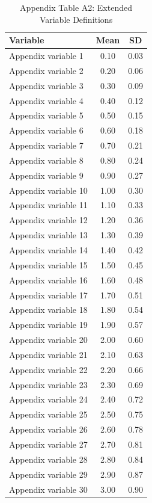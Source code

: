 \begin{longtable}{lcc}
\caption{Appendix Table A2: Extended Variable Definitions}\\
\toprule
Variable & Mean & SD \\
\midrule
Appendix variable 1 & 0.10 & 0.03 \\
Appendix variable 2 & 0.20 & 0.06 \\
Appendix variable 3 & 0.30 & 0.09 \\
Appendix variable 4 & 0.40 & 0.12 \\
Appendix variable 5 & 0.50 & 0.15 \\
Appendix variable 6 & 0.60 & 0.18 \\
Appendix variable 7 & 0.70 & 0.21 \\
Appendix variable 8 & 0.80 & 0.24 \\
Appendix variable 9 & 0.90 & 0.27 \\
Appendix variable 10 & 1.00 & 0.30 \\
Appendix variable 11 & 1.10 & 0.33 \\
Appendix variable 12 & 1.20 & 0.36 \\
Appendix variable 13 & 1.30 & 0.39 \\
Appendix variable 14 & 1.40 & 0.42 \\
Appendix variable 15 & 1.50 & 0.45 \\
Appendix variable 16 & 1.60 & 0.48 \\
Appendix variable 17 & 1.70 & 0.51 \\
Appendix variable 18 & 1.80 & 0.54 \\
Appendix variable 19 & 1.90 & 0.57 \\
Appendix variable 20 & 2.00 & 0.60 \\
Appendix variable 21 & 2.10 & 0.63 \\
Appendix variable 22 & 2.20 & 0.66 \\
Appendix variable 23 & 2.30 & 0.69 \\
Appendix variable 24 & 2.40 & 0.72 \\
Appendix variable 25 & 2.50 & 0.75 \\
Appendix variable 26 & 2.60 & 0.78 \\
Appendix variable 27 & 2.70 & 0.81 \\
Appendix variable 28 & 2.80 & 0.84 \\
Appendix variable 29 & 2.90 & 0.87 \\
Appendix variable 30 & 3.00 & 0.90 \\
\bottomrule
\end{longtable}
